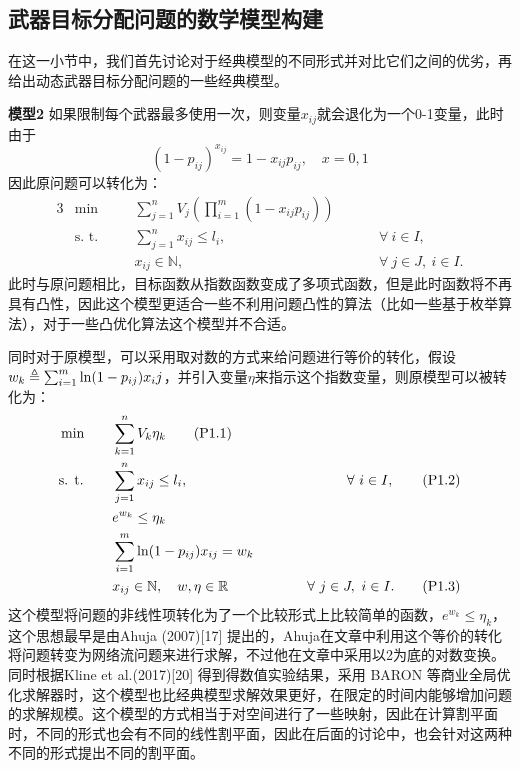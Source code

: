 \subsection{武器目标分配问题的数学模型构建}
在这一小节中，我们首先讨论对于经典模型的不同形式并对比它们之间的优劣，再给出动态武器目标分配问题的一些经典模型。

\textbf{模型2} 如果限制每个武器最多使用一次，则变量$x_{ij}$就会退化为一个0-1变量，此时由于
\begin{equation*}
    (1 - p_{ij})^{x_{ij}} = 1 - x_{ij}p_{ij},\quad x = 0, 1
\end{equation*}
因此原问题可以转化为：
\begin{alignat}{3}
    &\min\quad && \sum_{j=1}^n V_j \left( \prod_{i=1}^m (1 - x_{ij} p_{ij})  \right) \tag{P1.1} \\ 
    &\text{s. t.}\quad &&\sum_{j=1}^n x_{ij} \leq l_i, \quad &\hspace{1cm}\forall ~ i \in I, \tag{P1.2}\\
    & && x_{ij} \in \mathbb{N}, \quad &\hspace{1cm}\forall ~ j\in J, ~ i \in I. \tag{P1.3}
\end{alignat}
此时与原问题相比，目标函数从指数函数变成了多项式函数，但是此时函数将不再具有凸性，因此这个模型更适合一些不利用问题凸性的算法（比如一些基于枚举算法），对于一些凸优化算法这个模型并不合适。

同时对于原模型，可以采用取对数的方式来给问题进行等价的转化，假设$w_k \triangleq \sum_{i = 1}^{m} \ln(1 - p_{ij})x_ij$，并引入变量$\eta$来指示这个指数变量，则原模型可以被转化为：
\begin{alignat}{3}
    &\min\quad && \sum_{k=1}^n V_k \eta_k \tag{P1.1} \\ 
    &\text{s. t.}\quad &&\sum_{j=1}^n x_{ij} \leq l_i, \quad &\hspace{1cm}\forall ~ i \in I, \tag{P1.2}\\
    & && e^{w_k} \leq \eta_k \\
    & && \sum_{i = 1}^{m} \ln(1 - p_{ij})x_{ij} = w_k \\
    & && x_{ij} \in \mathbb{N},\quad w,\eta \in \mathbb{R} \quad &\hspace{1cm}\forall ~ j\in J, ~ i \in I. \tag{P1.3}
\end{alignat}
这个模型将问题的非线性项转化为了一个比较形式上比较简单的函数，$e^{w_k} \leq \eta_k$，这个思想最早是由Ahuja (2007)[17] 提出的，Ahuja在文章中利用这个等价的转化将问题转变为网络流问题来进行求解，不过他在文章中采用以2为底的对数变换。同时根据Kline et al.(2017)[20] 得到得数值实验结果，采用 BARON 等商业全局优化求解器时，这个模型也比经典模型求解效果更好，在限定的时间内能够增加问题的求解规模。这个模型的方式相当于对空间进行了一些映射，因此在计算割平面时，不同的形式也会有不同的线性割平面，因此在后面的讨论中，也会针对这两种不同的形式提出不同的割平面。


